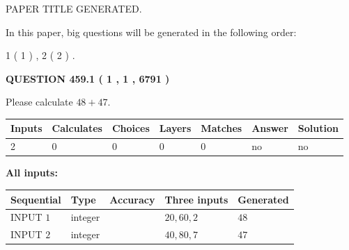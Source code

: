 \documentclass[12pt]{article}
\begin{document}
   
\vspace{0.2in}
   
   
   
   
   
   
   
   
 \vspace{0.2in}
 
 
 
 
   
   
 PAPER TITLE GENERATED.
   
   
   
\vspace{0.2in}
   
In this paper, big questions will be generated in the following order: 
   
   
   1 ( 1 )
 ,
   2 ( 2 )
 .
  
\vspace{0.2in}
  
{\textbf{\Large{QUESTION
459.1 
 ( 1 , 1 , 6791 )
}}}
  
  
 
Please calculate $ %
48 +  %
47 $.
 
 
   
   
   
   
\noindent\begin{tabular}{|l|l|l|l|l|l|l|}
 \hline
Inputs & Calculates & Choices & Layers & Matches & Answer & Solution \\ \hline
 2  & 
 0  & 
 0
  & 
 0  & 
 0  & 
  no & 
  no 
  \\ \hline
 \end{tabular}
   
   
   
   
\noindent{}
   
   
   
   
\noindent\vspace{0.1in}\hspace{-0.08in} {\textbf{\Large{All inputs: }}}
   
   
  
  
\noindent\begin{tabular}{|l|l|l|l|l|}
\hline
 Sequential & Type & Accuracy & Three inputs & Generated \\ 
\hline
 
 
  INPUT $  1 $ & integer &  & $
 20
 , 
 60
 , 
 2
 $ & $ 48 $ 
 \\  \hline  
 
 
  INPUT $  2 $ & integer &  & $
 40
 , 
 80
 , 
 7
 $ & $ 47 $ 
 \\  \hline  
 \end{tabular}
   
\end{document}
